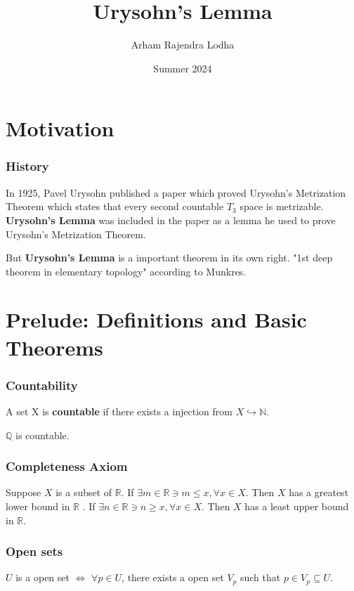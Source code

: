 \documentclass{beamer}
\title{Urysohn's Lemma}
\author{Arham Rajendra Lodha}
\institute{University of Texas at Austin}
\date{Summer 2024}
\newcommand*{\subeq}{\subseteq}
\newcommand{\R}{\mathbb{R}}
\newcommand{\Q}{\mathbb{Q}}
\newcommand{\N}{\mathbb{N}}
\begin{document}
\frame{\titlepage}

\section*{Motivation}
\begin{frame}
    \frametitle{History}

    In 1925, Pavel Urysohn published a paper which proved Urysohn's Metrization Theorem which states that every second countable $T_3$ space is metrizable. \textbf{Urysohn's Lemma} was included in the paper as a lemma he used to prove Urysohn's Metrization Theorem.  

    \bigskip

    But \textbf{Urysohn's Lemma} is a important theorem in its own right. "1st deep theorem in elementary topology" according to Munkres.

\end{frame}

\section*{Prelude: Definitions and Basic Theorems}
\begin{frame}
    \frametitle{Countability}

    \begin{definition}
        A set X is \textbf{countable} if there exists a injection from $X \hookrightarrow \N$.
    \end{definition}

    \begin{Theorem}
        $\Q$ is countable. 
    \end{Theorem}
    
    

\end{frame}

\begin{frame}
    \frametitle{Completeness Axiom}

    \begin{definition}
        Suppose $X$ is a subset of $\R$. If $\exists m \in \R \ni m \leq x, \forall x \in X$. Then $X$ has a greatest lower bound in $\R$ . If $\exists n \in \R \ni n \geq x, \forall x \in X$. Then $X$ has a least upper bound in $\R$. 
    \end{definition}
    

\end{frame}

\begin{frame}
    \frametitle{Open sets} 

    \begin{theorem}
        $U$ is a open set $\iff$ $\forall p \in U$, there exists a open set $V_p$ such that $p \in V_p \subeq U$.      
    \end{theorem}
\end{frame}
\end{document}
